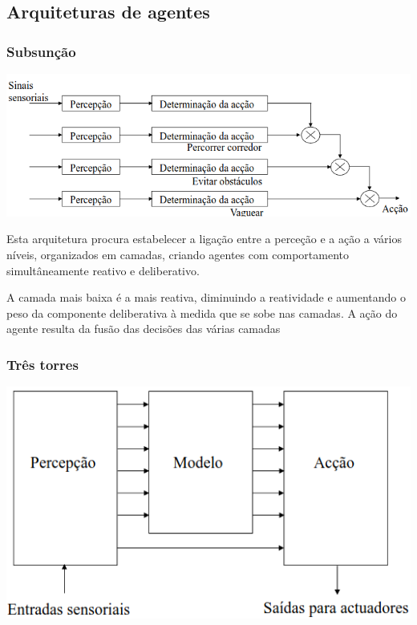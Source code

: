 \documentclass{article}
\begin{document}
\subsection{Arquiteturas de agentes}

\subsubsection{Subsunção}

\begin{center}
  \includegraphics[scale=0.35]{17}
\end{center}

Esta arquitetura procura estabelecer a ligação entre a perceção e a ação a vários níveis,
organizados em camadas, criando agentes com comportamento simultâneamente reativo e
deliberativo.

\vspace{2mm}

A camada mais baixa é a mais reativa, diminuindo a reatividade e aumentando o peso da
componente deliberativa à medida que se sobe nas camadas. A ação do agente resulta da fusão das
decisões das várias camadas

\subsubsection{Três torres}

\begin{center}
  \includegraphics[scale=0.33]{18}
\end{center}
\end{document}
